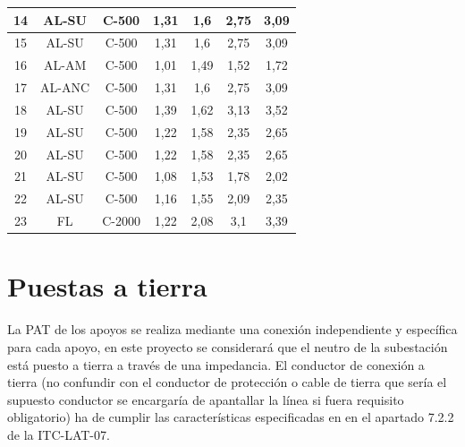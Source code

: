\begin{table}[htbp]
\begin{tabular}{|c|c|c|c|c|c|c|}
14          & AL-SU          & C-500         & 1,31           & 1,6            & 2,75               & 3,09                \\ \hline
15          & AL-SU          & C-500         & 1,31           & 1,6            & 2,75               & 3,09                \\ \hline
16          & AL-AM          & C-500         & 1,01           & 1,49           & 1,52               & 1,72                \\ \hline
17          & AL-ANC         & C-500         & 1,31           & 1,6            & 2,75               & 3,09                \\ \hline
18          & AL-SU          & C-500         & 1,39           & 1,62           & 3,13               & 3,52                \\ \hline
19          & AL-SU          & C-500         & 1,22           & 1,58           & 2,35               & 2,65                \\ \hline
20          & AL-SU          & C-500         & 1,22           & 1,58           & 2,35               & 2,65                \\ \hline
21          & AL-SU          & C-500         & 1,08           & 1,53           & 1,78               & 2,02                \\ \hline
22          & AL-SU          & C-500         & 1,16           & 1,55           & 2,09               & 2,35                \\ \hline
23          & FL             & C-2000        & 1,22           & 2,08           & 3,1                & 3,39                \\ \hline
\end{tabular}
\end{table}

\section{Puestas a tierra}
\label{sec:md-pat}
La \ac{PAT} de los apoyos se realiza mediante una conexión independiente y específica para cada apoyo, en este proyecto se considerará que el neutro de la subestación está puesto a tierra a través de una impedancia. El conductor de conexión a tierra (no confundir con el conductor de protección o  cable de tierra que sería el supuesto conductor se encargaría de apantallar la línea si fuera requisito obligatorio) ha de cumplir las características especificadas en en el apartado 7.2.2 de la ITC-LAT-07.

